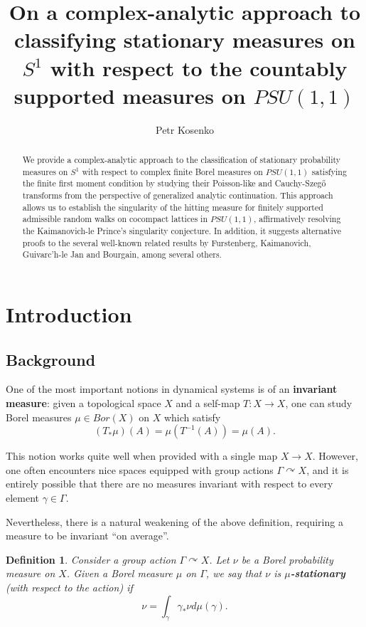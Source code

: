 \documentclass[11pt]{article}
\author{Petr Kosenko}
\title{On a complex-analytic approach to classifying stationary measures on $S^1$ with respect to the countably supported measures on $PSU(1,1)$}
\newtheorem{definition}{Definition}[section]
\begin{document}
\maketitle

\begin{abstract}
We provide a complex-analytic approach to the classification of stationary probability measures on $S^1$ with respect to complex finite Borel measures on $PSU(1,1)$ satisfying the finite first moment condition by studying their Poisson-like and Cauchy-Szeg\H{o} transforms from the perspective of generalized analytic continuation. This approach allows us to establish the singularity of the hitting measure for finitely supported admissible random walks on cocompact lattices in $PSU(1,1)$, affirmatively resolving the Kaimanovich-le Prince's singularity conjecture. In addition, it suggests alternative proofs to the several well-known related results by Furstenberg, Kaimanovich, Guivarc'h-le Jan and Bourgain, among several others.
\end{abstract}

\section{Introduction}

\subsection{Background}

One of the most important notions in dynamical systems is of an \textbf{invariant measure}: given a topological space $X$ and a self-map $T : X \rightarrow X$, one can study Borel measures $\mu \in Bor(X)$ on $X$ which satisfy
\begin{equation}
	(T_* \mu)(A) = \mu(T^{-1}(A)) = \mu(A).
\end{equation}

This notion works quite well when provided with a single map $X \rightarrow X$. However, one often encounters nice spaces equipped with group actions $\Gamma \curvearrowright X$, and it is entirely possible that there are no measures invariant with respect to every element $\gamma \in \Gamma$.

Nevertheless, there is a natural weakening of the above definition, requiring a measure to be invariant ``on average''.

\begin{definition}
	Consider a group action $\Gamma \curvearrowright X$. Let $\nu$ be a Borel probability measure on $X$. Given a Borel measure $\mu$ on $\Gamma$, we say that $\nu$ is \textbf{$\mu$-stationary} (with respect to the action) if
	\begin{equation}
		\label{intro: stationary measure}
		\nu = \int_\gamma  \gamma_* \nu d \mu(\gamma).
	\end{equation}
\end{definition}
\end{document}
